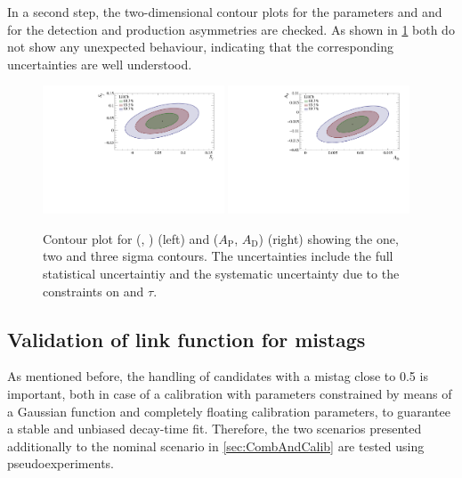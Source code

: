 In a second step, the two-dimensional contour plots for the \CP parameters \Sf and \Sfbar and for the detection and production asymmetries are checked.
As shown in \cref{fig:corrPlots} both do not show any unexpected behaviour, indicating that the corresponding uncertainties are well understood.
\begin{figure}[tbp]
    \centering
    \includegraphics[width=0.48\textwidth]{10TimeFit/figs/SfvsSfbar.pdf}
    \includegraphics[width=0.48\textwidth]{10TimeFit/figs/ApvsAd.pdf}
    \caption{Contour plot for (\Sf, \Sfbar) (left) and ($A_{\text{P}}$, $A_{\text{D}}$) (right) showing the one, two and three sigma contours.
    The uncertainties include the full statistical uncertaintiy and the systematic uncertainty due to the constraints on \dm and $\tau$.}
    \label{fig:corrPlots}
\end{figure}

\subsection{Validation of link function for mistags}
\label{sec:ValLinkFunction}

As mentioned before, the handling of candidates with a mistag close to \num{0.5} is important, both in case of a calibration with parameters constrained by means of a Gaussian function and completely floating calibration parameters, to guarantee a stable and unbiased decay-time fit.
Therefore, the two scenarios presented additionally to the nominal scenario in \cref{sec:CombAndCalib} are tested using pseudoexperiments.

